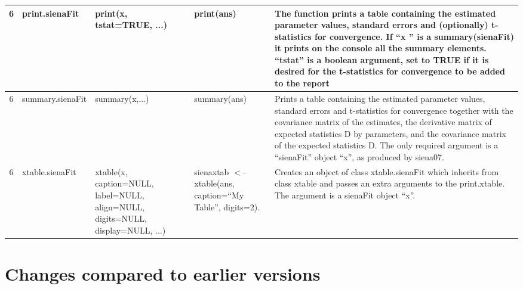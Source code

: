 \documentclass[a4paper,fleqn,11pt]{article}
\newcommand{\+}{\, + \,}
\begin{document}
{\begin{landscape}
\begin{small}
\begin{longtable}{c | p{2.4cm} | p{4.5cm} | p{4.0cm} | p{9.0cm} }
6 & print.sienaFit & print(x, tstat=TRUE, ...) & print(ans) & The function
prints a table containing the estimated parameter values, standard errors and
(optionally) t-statistics for convergence. If ``x '' is a summary(sienaFit) it
prints on the console all the summary elements. ``tstat'' is a boolean
argument, set to TRUE if it is desired for the t-statistics for convergence to
be added to the report\\
\hline

6 & summary.sienaFit & summary(x,...) & summary(ans) & Prints a table
containing the estimated parameter values, standard errors and t-statistics for
convergence together with the covariance matrix of the estimates, the
derivative matrix of expected statistics D by parameters, and the covariance
matrix of the expected statistics D.  The only required argument is a
``sienaFit'' object ``x'', as produced by  siena07.\\
\hline

6 & xtable.sienaFit & xtable(x, caption=NULL, \newline
label=NULL, align=NULL, \newline
digits=NULL,\newline
 display=NULL, ...) & sienaxtab $<$-- \newline
 xtable(ans, \newline
caption=``My
Table'', \newline
digits=2).  &Creates an object of class xtable.sienaFit which inherits
from class xtable and passes an extra arguments to the print.xtable.
The argument is a sienaFit object ``x''. \\
\hline


\end{longtable}
\end{small}
\end{landscape}


%



\section{Changes compared to earlier versions}

}
\end{document}
